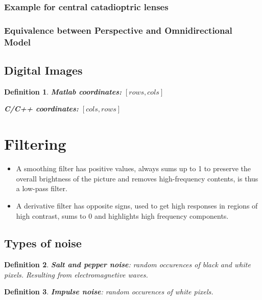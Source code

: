 \documentclass[10pt,a4paper]{scrartcl}
\newtheorem{define}{Definition}
\begin{document}
\begin{multicols*}{2}
\subsubsection{Example for central catadioptric lenses}


\subsubsection{Equivalence between Perspective and Omnidirectional Model}


\subsection{Digital Images}

\begin{define}

\textbf{Matlab coordinates:} $[rows,cols]$

\textbf{C/C++ coordinates:} $[cols,rows]$
\end{define}

\section{Filtering}

\begin{itemize}
\item A smoothing filter has positive values, always sums up to 1 to preserve the overall brightness of the picture and removes high-frequency contents, is thus a low-pass filter.
\item A derivative filter has opposite signs, used to get high responses in regions of high contrast, sums to 0 and highlights high frequency components.
\end{itemize}

\subsection{Types of noise}

\begin{define}
\textbf{Salt and pepper noise}: random occurences of black and white pixels. Resulting from electromagnetive waves.
\end{define}

\begin{define}
\textbf{Impulse noise}: random occurences of white pixels.
\end{define}


\end{multicols*}
\end{document}
